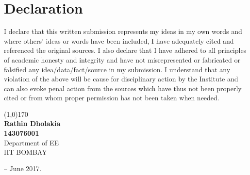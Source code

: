 \chapter*{Declaration}
I declare that this written submission represents my ideas in my own words and where 
others' ideas or words have been included, I have adequately cited and referenced the original 
sources.  I also declare that I have adhered to all principles of academic honesty and integrity 
and   have   not   misrepresented   or   fabricated   or   falsified   any   idea/data/fact/source   in   my 
submission.  I understand that any violation of the above will be cause for disciplinary action 
by the Institute and can also evoke  penal action from the sources which have thus not been 
properly cited or from whom proper permission has not been taken when needed.

\vspace{3.0cm}
\begin{flushright}
\line(1,0){170}
\vspace*{10pt} \\
\textbf{Rathin Dholakia \\
143076001}\\
Department of EE \\
IIT BOMBAY
\end{flushright}
\begin{flushleft}
-- June 2017.
\end{flushleft}
